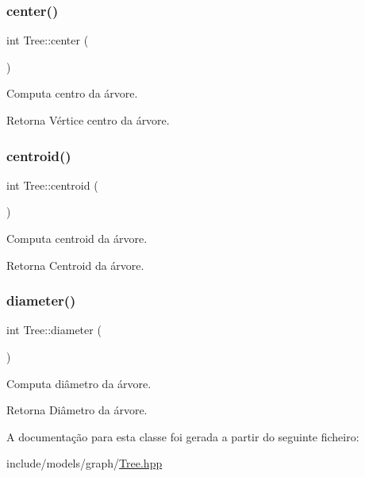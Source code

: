 \subsubsection{\texorpdfstring{center()}{center()}}
{\footnotesize\ttfamily int Tree\+::center (\begin{DoxyParamCaption}{ }\end{DoxyParamCaption})}

Computa centro da árvore. \begin{DoxyReturn}{Retorna}
Vértice centro da árvore. 
\end{DoxyReturn}
\mbox{\label{classTree_a568a379c4a528faf192b2a97ac3a20bb}} 
\subsubsection{\texorpdfstring{centroid()}{centroid()}}
{\footnotesize\ttfamily int Tree\+::centroid (\begin{DoxyParamCaption}{ }\end{DoxyParamCaption})}

Computa centroid da árvore. \begin{DoxyReturn}{Retorna}
Centroid da árvore. 
\end{DoxyReturn}
\mbox{\label{classTree_a8a296a740609d29e4ff991549b7f8f92}} 
\subsubsection{\texorpdfstring{diameter()}{diameter()}}
{\footnotesize\ttfamily int Tree\+::diameter (\begin{DoxyParamCaption}{ }\end{DoxyParamCaption})}

Computa diâmetro da árvore. \begin{DoxyReturn}{Retorna}
Diâmetro da árvore. 
\end{DoxyReturn}


A documentação para esta classe foi gerada a partir do seguinte ficheiro\+:\begin{DoxyCompactItemize}
\item 
include/models/graph/\hyperlink{Tree_8hpp}{Tree.\+hpp}\end{DoxyCompactItemize}
